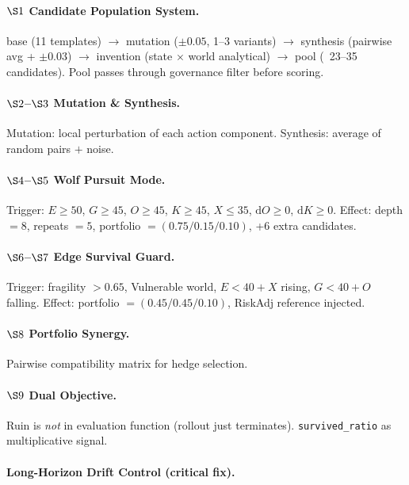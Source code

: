 \paragraph{$\S 1$ Candidate Population System.}
base (11 templates) $\to$ mutation ($\pm 0.05$, 1--3 variants) $\to$
synthesis (pairwise avg + $\pm 0.03$) $\to$ invention
(state $\times$ world analytical) $\to$ pool (~23--35 candidates).
Pool passes through governance filter before scoring.

\paragraph{$\S 2$--$\S 3$ Mutation \& Synthesis.}
Mutation: local perturbation of each action component. Synthesis:
average of random pairs $+$ noise.

\paragraph{$\S 4$--$\S 5$ Wolf Pursuit Mode.}
Trigger: $E \ge 50$, $G \ge 45$, $O \ge 45$, $K \ge 45$, $X \le 35$,
$\mathrm{d}O \ge 0$, $\mathrm{d}K \ge 0$. Effect: depth $= 8$,
repeats $= 5$, portfolio $= (0.75 / 0.15 / 0.10)$, +6 extra
candidates.

\paragraph{$\S 6$--$\S 7$ Edge Survival Guard.}
Trigger: fragility $> 0.65$, Vulnerable world, $E < 40 + X$ rising,
$G < 40 + O$ falling. Effect: portfolio $= (0.45 / 0.45 / 0.10)$,
RiskAdj reference injected.

\paragraph{$\S 8$ Portfolio Synergy.}
Pairwise compatibility matrix for hedge selection.

\paragraph{$\S 9$ Dual Objective.}
Ruin is \emph{not} in evaluation function (rollout just terminates).
\texttt{survived\_ratio} as multiplicative signal.

\paragraph{Long-Horizon Drift Control (critical fix).}

